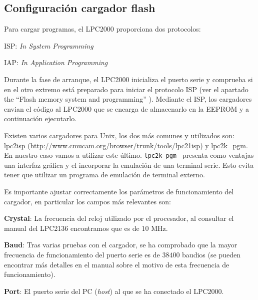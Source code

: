 \documentclass[10pt,a4paper]{article}
\newcommand{\hrefx}[1]{\href{#1}{#1}} %
\newenvironment{itemize*}
        {\begin{itemize}%
                \setlength{\parskip}{2pt}%
                \setlength{\itemsep}{0pt}}
        {\end{itemize}}
\begin{document}
	\subsection{Configuración cargador flash}

	Para cargar programas, el LPC2000 proporciona dos protocolos:

	\begin{itemize*}
	\item ISP: \emph{In System Programming}
	\item IAP: \emph{In Application Programming}
	\end{itemize*}
	
	Durante la fase de arranque, el LPC2000 inicializa el puerto serie y comprueba si en el otro extremo está preparado para iniciar el protocolo ISP (ver el apartado the ``Flash memory system and programming'' \cite{lpc213x-um}). Mediante el ISP, los cargadores envian el código al LPC2000 que se encarga de almacenarlo en la EEPROM y a continuación ejecutarlo.
	
	Existen varios cargadores para Unix, los dos más comunes y utilizados son: lpc2isp (\hrefx{http://www.cmucam.org/\-browser/\-trunk/\-tools/\-lpc21isp}) y lpc2k\_pgm.  En nuestro caso vamos a utilizar este último. \texttt{lpc2k\_pgm}~\cite{lpc2k_pgm} presenta como ventajas una interfaz gráfica y el incorporar la emulación de una terminal serie. Esto evita tener que utilizar un programa de emulación de terminal externo.
	
	Es importante ajustar correctamente los parámetros de funcionamiento del cargador, en particular los campos más relevantes son:

	\begin{itemize*}
	\item \textbf{Crystal}: La frecuencia del reloj utilizado por el procesador, al consultar el manual del LPC2136 encontramos que es de $10$ MHz.

	\item \textbf{Baud}: Tras varias pruebas con el cargador, se ha comprobado que la mayor frecuencia de funcionamiento del puerto 	serie es de $38400$ baudios (se pueden encontrar más detalles en el manual sobre el motivo de esta frecuencia de funcionamiento).
	  
	\item \textbf{Port}: El puerto serie del PC (\emph{host}) al que se ha conectado el LPC2000.
	\end{itemize*}
	
\end{document}
